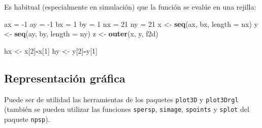 \documentclass[
]{book}
\newenvironment{Shaded}{\begin{snugshade}}{\end{snugshade}}
\newcommand{\DataTypeTok}[1]{\textcolor[rgb]{0.13,0.29,0.53}{#1}}
\newcommand{\DecValTok}[1]{\textcolor[rgb]{0.00,0.00,0.81}{#1}}
\newcommand{\KeywordTok}[1]{\textcolor[rgb]{0.13,0.29,0.53}{\textbf{#1}}}
\newcommand{\NormalTok}[1]{#1}
\newcommand{\OperatorTok}[1]{\textcolor[rgb]{0.81,0.36,0.00}{\textbf{#1}}}
\newcommand{\StringTok}[1]{\textcolor[rgb]{0.31,0.60,0.02}{#1}}
\theoremstyle{break}
\theoremstyle{definition}
\theoremstyle{definition}
\theoremstyle{definition}
\theoremstyle{remark}
\begin{document}
Es habitual (especialmente en simulación) que la función se evalúe en una rejilla:

\begin{Shaded}
\begin{Highlighting}[]
\NormalTok{ax =}\StringTok{ }\DecValTok{-1}
\NormalTok{ay =}\StringTok{ }\DecValTok{-1}
\NormalTok{bx =}\StringTok{ }\DecValTok{1}
\NormalTok{by =}\StringTok{ }\DecValTok{1}
\NormalTok{nx =}\StringTok{ }\DecValTok{21}
\NormalTok{ny =}\StringTok{ }\DecValTok{21}
\NormalTok{x <-}\StringTok{ }\KeywordTok{seq}\NormalTok{(ax, bx, }\DataTypeTok{length =}\NormalTok{ nx)}
\NormalTok{y <-}\StringTok{ }\KeywordTok{seq}\NormalTok{(ay, by, }\DataTypeTok{length =}\NormalTok{ ny)}
\NormalTok{z <-}\StringTok{ }\KeywordTok{outer}\NormalTok{(x, y, f2d)}

\NormalTok{hx <-}\StringTok{ }\NormalTok{x[}\DecValTok{2}\NormalTok{]}\OperatorTok{-}\NormalTok{x[}\DecValTok{1}\NormalTok{]}
\NormalTok{hy <-}\StringTok{ }\NormalTok{y[}\DecValTok{2}\NormalTok{]}\OperatorTok{-}\NormalTok{y[}\DecValTok{1}\NormalTok{]}
\end{Highlighting}
\end{Shaded}

\hypertarget{representaciuxf3n-gruxe1fica}{%
\subsection{Representación gráfica}\label{representaciuxf3n-gruxe1fica}}

Puede ser de utilidad las herramientas de los paquetes \texttt{plot3D} y \texttt{plot3Drgl}
(también se pueden utilizar las funciones \texttt{spersp}, \texttt{simage}, \texttt{spoints} y \texttt{splot}
del paquete \texttt{npsp}).
\end{document}
